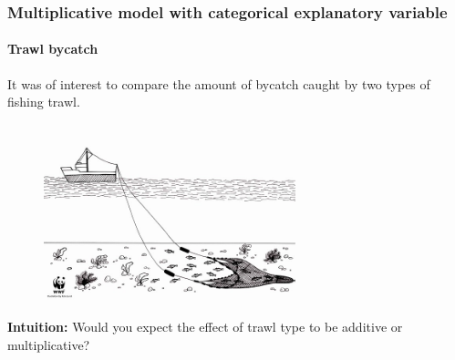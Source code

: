 \documentclass{beamer}\usepackage[]{graphicx}\usepackage[]{xcolor}
\begin{document}
\begin{frame}[fragile]
\frametitle{Multiplicative model with categorical explanatory variable}
\framesubtitle{Trawl bycatch}

It was of interest to compare the amount of bycatch caught by two types of fishing trawl.

\begin{figure}
  \centering
  \includegraphics[width=0.65\textwidth]{DemersalTrawling.jpg} 
\end{figure}

\textbf{Intuition:} Would you expect the effect of trawl type to be additive or multiplicative?

\end{frame}
\end{document}
